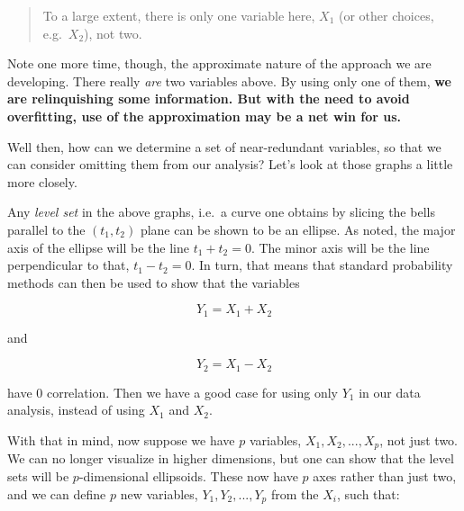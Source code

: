 \begin{quote}

To a large extent, there is only one variable here, $X_1$ (or other
choices, e.g.\ $X_2$), not two.  

\end{quote}

Note one more time, though, the approximate nature of the approach we
are developing.  There really \textit{are} two variables above.  By
using only one of them, \textbf{we are relinquishing some information.  But with
the need to avoid overfitting, use of the approximation may be a net win
for us.}

Well then, how can we determine a set of near-redundant variables, so
that we can consider omitting them from our analysis?  Let's look at
those graphs a little more closely.

Any \textit{level set} in the above graphs, i.e.\ a curve one
obtains by slicing the bells parallel to the $(t_1,t_2)$ plane can be
shown to be an ellipse.  As noted, the major axis of the ellipse will be
the line $t_1 + t_2 = 0$.  The minor axis will be the line perpendicular
to that, $t_1 - t_2 = 0$.  In turn, that means that standard probability
methods can then be used to show that the variables

\begin{equation}
Y_1 = X_1 + X_2 
\end{equation}

and 

\begin{equation}
Y_2 = X_1 - X_2 
\end{equation}

have 0 correlation.  Then we have a good case for using only $Y_1$ in
our data analysis, instead of using $X_1$ and $X_2$.  


With that in mind, now suppose we have $p$ variables, $X_1,
X_2,...,X_p$, not just two.  We can no longer visualize in higher
dimensions, but one can show that the level sets will be 
$p$-dimensional ellipsoids.  These now have $p$ axes rather than just
two, and we can define $p$ new variables, $Y_1,Y_2,...,Y_p$ from the
$X_i$, such that:

